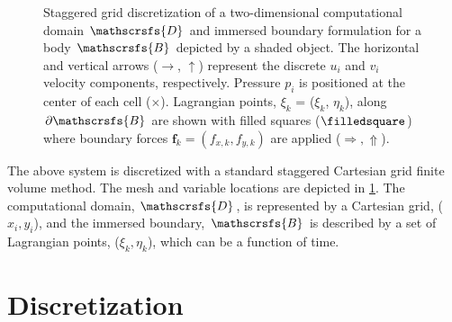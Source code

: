 \documentclass{article}
\numberwithin{equation}{section}
\begin{document}
\begin{figure}[H] %
  \caption{Staggered grid discretization of a two-dimensional computational domain $\mathscrsfs{D}$ and immersed boundary formulation for a body $\mathscrsfs{B}$ depicted by a shaded object. The horizontal and vertical arrows ($\rightarrow$, $\uparrow$) represent the discrete $u_i$ and $v_i$ velocity components, respectively. Pressure $p_i$ is positioned at the center of each cell ($\times$). Lagrangian points, $\xi_k$ = ($\xi_k$, $\eta_k$), along $\partial\mathscrsfs{B}$ are shown with filled squares ($\filledsquare$) where boundary forces $\boldsymbol{f}_k=(f_{x,k},f_{y,k})$ are applied ($\Rightarrow,\Uparrow$).}\label{fig:1}
\end{figure}

The above system is discretized with a standard staggered Cartesian grid finite volume method. The mesh and variable locations are depicted in \cref{fig:1}. The computational domain, $\mathscrsfs{D}$, is represented by a Cartesian grid, ($x_i, y_i$), and the immersed boundary, $\mathscrsfs{B}$ is described by a set of Lagrangian points, ($\xi_k,\eta_k$), which can be a function of time.

\section{Discretization}\label{sec:discretization}
\end{document}
